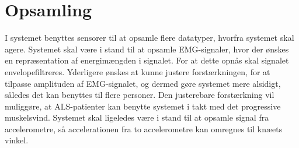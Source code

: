 \section{Opsamling} \label{sec:sensorer}
I systemet benyttes sensorer til at opsamle flere datatyper, hvorfra systemet skal agere. Systemet skal være i stand til at opsamle EMG-signaler, hvor der ønskes en repræsentation af energimængden i signalet. For at dette opnås skal signalet envelopefiltreres. Yderligere ønskes at kunne justere forstærkningen, for at tilpasse amplituden af EMG-signalet, og dermed gøre systemet mere alsidigt, således det kan benyttes til flere personer. Den justerebare forstærkning vil muliggøre, at ALS-patienter kan benytte systemet i takt med det progressive muskelsvind.
Systemet skal ligeledes være i stand til at opsamle signal fra accelerometre, så accelerationen fra to accelerometre kan omregnes til knæets vinkel.